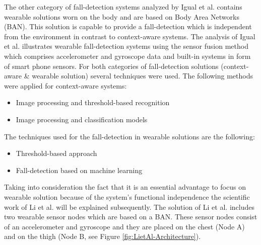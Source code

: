 \documentclass[review]{elsarticle}
\begin{document}
The other category of fall-detection systems analyzed by Igual et al. \cite{Igual2013} contains wearable solutions worn on the body and are based on Body Area Networks (BAN). This solution is capable to provide a fall-detection which is independent from the environment in contrast to context-aware systems. The analysis of Igual et al. \cite{Igual2013} illustrates wearable fall-detection systems using the sensor fusion method which comprises accelerometer and gyroscope data and built-in systems in form of smart phone sensors. For both categories of fall-detection solutions (context-aware \& wearable solution) several techniques were used. The following methods were applied for context-aware systems:
\begin{itemize}
	\item Image processing and threshold-based recognition
	\item Image processing and classification models
\end{itemize}
The techniques used for the fall-detection in wearable solutions are the following:
\begin{itemize}
	\item Threshold-based approach
	\item Fall-detection based on machine learning
\end{itemize}
Taking into consideration the fact that it is an essential advantage to focus on wearable solution because of the system's functional independence the scientific work of Li et al. \cite{Li2009} will be explained subsequently. The solution of Li et al. \cite{Li2009} includes two wearable sensor nodes which are based on a BAN. These sensor nodes consist of an accelerometer and gyroscope and they are placed on the chest (Node A) and on the thigh (Node B, see Figure \ref{fig:LietAl-Architecture}). 
\end{document}
